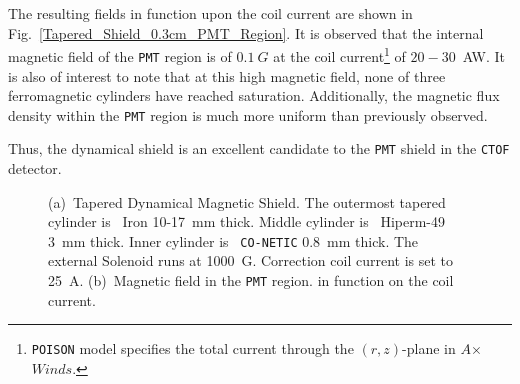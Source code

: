 \documentclass[12pt]{article}
\begin{document}
The resulting fields in function upon the coil current 
are shown in  Fig.~\ref{Tapered_Shield_0.3cm_PMT_Region}.
It is observed that the internal magnetic field of the {\tt PMT} 
region is of $0.1~G$ 
at the  coil 
current\footnote{ {\tt POISON} model specifies the total  
current through the $(r,z)$-plane in $A$$\times$$Winds$.}
of $20-30$~AW.
It is also of interest to note that at this high magnetic field,
none of three ferromagnetic cylinders have reached saturation.
Additionally, the magnetic flux density within the {\tt PMT} region is much more uniform
than previously observed.

Thus, the dynamical shield   is an  excellent candidate 
to the {\tt PMT} shield in  the {\tt CTOF} detector.
%
\begin{figure}[htbp]%
\centering
{}
\qquad
{}
\caption{\small{
(a)~Tapered Dynamical Magnetic Shield. The outermost tapered cylinder is ~Iron  10-17~mm thick.
 Middle cylinder is ~Hiperm-49 3~mm thick. Inner cylinder is ~{\tt CO-NETIC} 0.8~mm thick.  
The external Solenoid runs  at 1000~G. Correction coil current is set to 25~A.
(b)~Magnetic field in the  {\tt PMT} region.}  in function on the coil current.}
\label{Tapered_Shield_0.3cm}
\end{figure}
\end{document}
